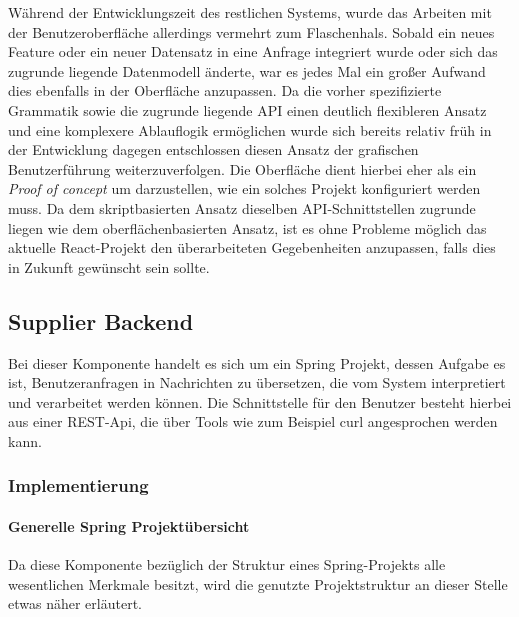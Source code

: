 Während der Entwicklungszeit des restlichen Systems, wurde das Arbeiten mit der Benutzeroberfläche allerdings vermehrt zum Flaschenhals. Sobald ein neues Feature oder ein neuer Datensatz in eine Anfrage integriert wurde oder sich das zugrunde liegende Datenmodell änderte, war es jedes Mal ein großer Aufwand dies ebenfalls in der Oberfläche anzupassen. Da die vorher spezifizierte Grammatik sowie die zugrunde liegende API einen deutlich flexibleren Ansatz und eine komplexere Ablauflogik ermöglichen wurde sich bereits relativ früh in der Entwicklung dagegen entschlossen diesen Ansatz der grafischen Benutzerführung weiterzuverfolgen. Die Oberfläche dient hierbei eher als ein \emph{Proof of concept} um darzustellen, wie ein solches Projekt konfiguriert werden muss. Da dem skriptbasierten Ansatz dieselben API-Schnittstellen zugrunde liegen wie dem oberflächenbasierten Ansatz, ist es ohne Probleme möglich das aktuelle React-Projekt den überarbeiteten Gegebenheiten anzupassen, falls dies in Zukunft gewünscht sein sollte.


\subsection{Supplier Backend \checkmark}
Bei dieser Komponente handelt es sich um ein Spring Projekt, dessen Aufgabe es ist, Benutzeranfragen in Nachrichten zu übersetzen, die vom System interpretiert und verarbeitet werden können. Die Schnittstelle für den Benutzer besteht hierbei aus einer REST-Api, die über Tools wie zum Beispiel curl angesprochen werden kann.

\subsubsection{Implementierung}

\paragraph{Generelle Spring Projektübersicht \checkmark}
Da diese Komponente bezüglich der Struktur eines Spring-Projekts alle wesentlichen Merkmale besitzt, wird die genutzte Projektstruktur an dieser Stelle etwas näher erläutert. 

